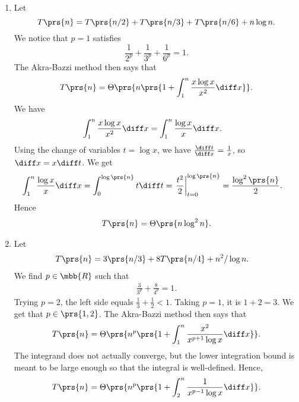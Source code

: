 \documentclass[oneside]{scrbook}
\theoremstyle{definition}
\begin{document}
\begin{exercise}
\begin{enumerate}[label = \alph*.]
\item %
Let
\[T\prs{n} = T\prs{n/2} + T\prs{n/3} + T\prs{n/6} + n \log n \text{.}\]
We notice that $p = 1$ satisfies
\[\frac{1}{2^p} + \frac{1}{3^p} + \frac{1}{6^p} = 1 \text{.}\]
The Akra-Bazzi method then says that
\begin{align*}
T\prs{n} = \Theta\prs{n \prs{1 + \int_1^n \frac{x \log x}{x^2} \diff x}} \text{.}
\end{align*}
We have
\begin{align*}
\int_1^n \frac{x \log x}{x^2} \diff x &= \int_1^n \frac{\log x}{x} \diff x \text{.}
\end{align*}
Using the change of variables $t = \log x$, we have $\frac{\diff t}{\diff x} = \frac{1}{x}$, so $\diff x = x \diff t$. We get
\begin{align*}
\int_1^n \frac{\log x}{x} \diff x &= \int_0^{\log\prs{n}} t \diff t = \left. \frac{t^2}{2} \right|_{t=0}^{\log\prs{n}} = \frac{\log^2\prs{n}}{2} \text{.}
\end{align*}
Hence
\begin{align*}
T\prs{n} = \Theta\prs{n \log^2 n} \text{.}
\end{align*}

\item %
Let
\begin{align*}
T\prs{n} &= 3 \prs{n/3} + 8T\prs{n/4} + n^2 / \log n \text{.}
\end{align*}
We find $p \in \mbb{R}$ such that
\begin{align*}
\frac{3}{3^p} + \frac{8}{4^p} = 1 \text{.}
\end{align*}
Trying $p = 2$, the left side equals $\frac{1}{3} + \frac{1}{2} < 1$. Taking $p = 1$, it is $1 + 2 = 3$. We get that $p \in \prs{1,2}$.
The Akra-Bazzi method then says that
\begin{align*}
T\prs{n} = \Theta\prs{n^p \prs{1 + \int_1^n \frac{x^2}{x^{p+1} \log x} \diff x}} \text{.}
\end{align*}
The integrand does not actually converge, but the lower integration bound is meant to be large enough so that the integral is well-defined. Hence,
\begin{align*}
T\prs{n} = \Theta\prs{n^p \prs{1 + \int_2^n \frac{1}{x^{p-1} \log x} \diff x}} \text{.}
\end{align*}


\end{enumerate}
\end{exercise}
\end{document}
